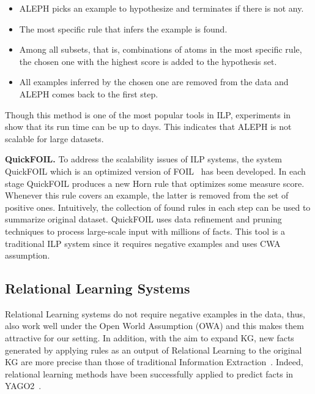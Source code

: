 \begin{itemize}
\item ALEPH picks an example to hypothesize and terminates if there is not any.
\item The most specific rule that infers the example is found.
\item Among all subsets, that is, combinations of atoms in the most specific rule, the chosen one with the highest score is added to the hypothesis set.
\item All examples inferred by the chosen one are removed from the data and ALEPH comes back to the first step.
\end{itemize}

Though this method is one of the most popular tools in ILP, experiments in~\cite{ref10} show that its run time can be up to days. This indicates that ALEPH is not scalable for large datasets.

\textbf{QuickFOIL.} To address the scalability issues of ILP systems, the system QuickFOIL which is an optimized version of FOIL~\cite{ref36} has been developed. In each stage QuickFOIL produces a new Horn rule that optimizes some measure score. Whenever this rule covers an example, the latter is removed from the set of positive ones. Intuitively, the collection of found rules in each step can be used to summarize original dataset. QuickFOIL uses data refinement and pruning techniques to process large-scale input with millions of facts. This tool is a traditional ILP system since it requires negative examples and uses CWA assumption.

\subsection{Relational Learning Systems}

Relational Learning systems do not require negative examples in the data, thus, also work well under the Open World Assumption (OWA) and this makes them attractive for our setting. In addition, with the aim to expand KG, new facts generated by applying rules as an output of Relational Learning to the original KG are more precise than those of traditional Information Extraction~\cite{ref29}. Indeed, relational learning methods have been successfully applied to predict facts in YAGO2~\cite{ref30}.

